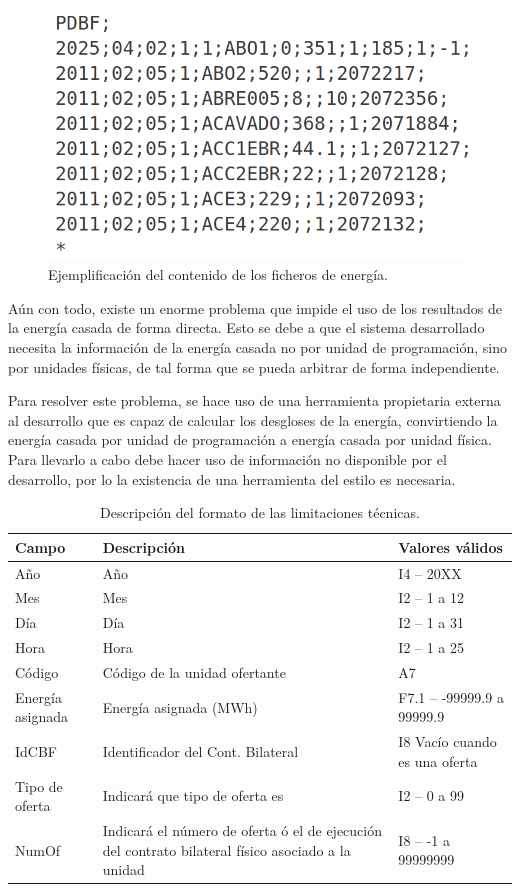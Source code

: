 \begin{figure}
  \centering
  \includegraphics[width=0.5\linewidth]{figures/contenido-energia.png}
  \caption{Ejemplificación del contenido de los ficheros de energía.}
  \label{fig:contenido-energia}
\end{figure}

Aún con todo, existe un enorme problema que impide el uso de los resultados de la energía casada de forma directa. Esto se debe a que el sistema desarrollado necesita la información de la energía casada no por unidad de programación, sino por unidades físicas, de tal forma que se pueda arbitrar de forma independiente.

Para resolver este problema, se hace uso de una herramienta propietaria externa al desarrollo que es capaz de calcular los desgloses de la energía, convirtiendo la energía casada por unidad de programación a energía casada por unidad física. Para llevarlo a cabo debe hacer uso de información no disponible por el desarrollo, por lo la existencia de una herramienta del estilo es necesaria.

\begin{table}[ht]
  \centering
  \begin{tabular}{|l|p{5cm}|l|}
    \hline
    Campo & Descripción & Valores válidos\\
    \hline
    Año & Año & I4 -- 20XX\\
    Mes & Mes & I2 -- 1 a 12\\
    Día & Día & I2 -- 1 a 31\\
    Hora & Hora & I2 -- 1 a 25\\
    Código & Código de la unidad ofertante & A7\\
    Energía asignada & Energía asignada (MWh) & F7.1 – -99999.9 a 99999.9\\
    IdCBF & Identificador del Cont. Bilateral & I8 Vacío cuando es una oferta\\
    Tipo de oferta & Indicará que tipo de oferta es & I2 – 0 a 99\\
    NumOf & Indicará el número de oferta ó el de ejecución del contrato bilateral físico asociado a la unidad & I8 – -1 a 99999999\\
    \hline
  \end{tabular}
  \caption{Descripción del formato de las limitaciones técnicas.}
  \label{tab:descripción-limitaciones}
\end{table}

